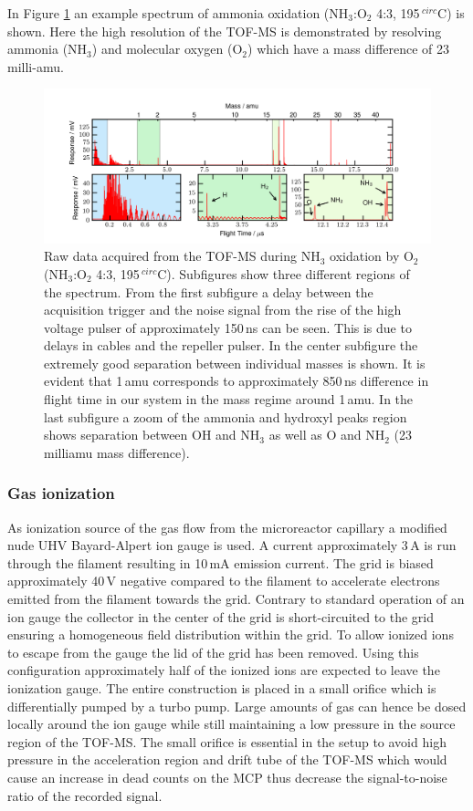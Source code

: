 \documentclass[aip,rsi]{revtex4-1}
\begin{document}
In Figure \ref{fig:untreated_data} an example spectrum of ammonia oxidation (NH$_3$:O$_2$ 4:3, 195\,$^{circ}$C) is shown. Here the high resolution of the TOF-MS is demonstrated by resolving ammonia (NH$_3$) and molecular oxygen (O$_2$) which have a mass difference of 23\,milli-amu.
\begin{figure}
 \includegraphics[width=16cm]{untreated_data.png}%
 \caption{Raw data acquired from the TOF-MS during NH$_3$ oxidation by O$_2$ (NH$_3$:O$_2$ 4:3, 195\,$^{circ}$C). Subfigures show three different regions of the spectrum. From the first subfigure a delay between the acquisition trigger and the noise signal from the rise of the high voltage pulser of approximately 150\,ns can be seen. This is due to delays in cables and the repeller pulser. In the center subfigure the extremely good separation between individual masses is shown. It is evident that 1\,amu corresponds to approximately 850\,ns difference in flight time in our system in the mass regime around 1\,amu. In the last subfigure a zoom of the ammonia and hydroxyl peaks region shows separation between OH and NH$_3$ as well as O and NH$_2$  (23\,milliamu mass difference).\label{fig:untreated_data}}%
\end{figure}

\subsubsection{Gas ionization}
As ionization source of the gas flow from the microreactor capillary a modified nude UHV Bayard-Alpert ion gauge is used. A current approximately 3\,A is run through the filament resulting in 10\,mA emission current. The grid is biased approximately 40\,V negative compared to the filament to accelerate electrons emitted from the filament towards the grid. Contrary to standard operation of an ion gauge the collector in the center of the grid is short-circuited to the grid ensuring a homogeneous field distribution within the grid. To allow ionized ions to escape from the gauge the lid of the grid has been removed. Using this configuration approximately half of the ionized ions are expected to leave the ionization gauge\cite{Nottingham1955}. The entire construction is placed in a small orifice which is differentially pumped by a turbo pump. Large amounts of gas can hence be dosed locally around the ion gauge while still maintaining a low pressure in the source region of the TOF-MS. The small orifice is essential in the setup to avoid high pressure in the acceleration region and drift tube of the TOF-MS which would cause an increase in dead counts on the MCP thus decrease the signal-to-noise ratio of the recorded signal.
\end{document}
